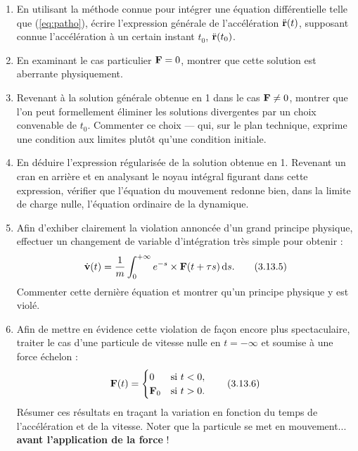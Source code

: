 \documentclass[a4paper,10pt]{report}
\begin{document}
\begin{enumerate}
	\item En utilisant la méthode connue pour intégrer une équation différentielle telle que (\ref{eq:patho}), écrire l’expression générale de l’accélération $\ddot{\vb{r}}(t)$, supposant connue l’accélération à un certain instant $t_0$, $\ddot{\vb{r}}(t_0)$.
	
	\item En examinant le cas particulier $\vb{F} = 0$, montrer que cette solution est aberrante physiquement.
	
	\item Revenant à la solution générale obtenue en 1 dans le cas $\vb{F} \neq 0$, montrer que l’on peut formellement éliminer les solutions divergentes par un choix convenable de $t_0$. Commenter ce choix --- qui, sur le plan technique, exprime une condition aux limites plutôt qu’une condition initiale.
	
	\item En déduire l’expression régularisée de la solution obtenue en 1. Revenant un cran en arrière et en analysant le noyau intégral figurant dans cette expression, vérifier que l’équation du mouvement redonne bien, dans la limite de charge nulle, l’équation ordinaire de la dynamique.
	
	\item Afin d’exhiber clairement la violation annoncée d’un grand principe physique, effectuer un changement de variable d’intégration très simple pour obtenir :
	\begin{equation}
		\dot{\vb{v}}(t) = \frac{1}{m} \int_0^{+\infty} e^{-s} \times \vb{F}(t + \tau s) \, \text ds. \tag{3.13.5}\label{eq:viol}
	\end{equation}
	Commenter cette dernière équation et montrer qu’un principe physique y est violé.
	
	\item Afin de mettre en évidence cette violation de façon encore plus spectaculaire, traiter le cas d’une particule de vitesse nulle en $t = -\infty$ et soumise à une force échelon :
	\begin{equation}
		\vb{F}(t) = 
		\begin{cases}
			0 & \text{si } t < 0, \\
			\vb{F}_0 & \text{si } t > 0.
		\end{cases} \tag{3.13.6}
	\end{equation}
	Résumer ces résultats en traçant la variation en fonction du temps de l’accélération et de la vitesse. Noter que la particule se met en mouvement... \textbf{avant l’application de la force} !
\end{enumerate}
\end{document}
